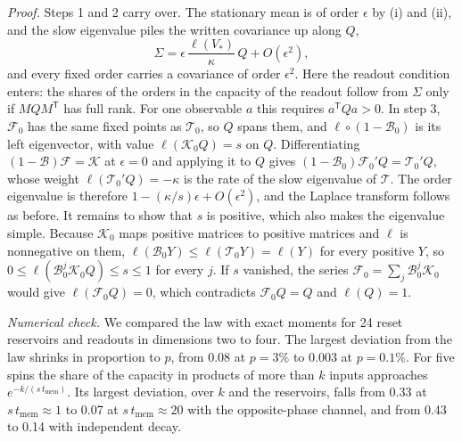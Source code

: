 \emph{Proof.} Steps 1 and 2 carry over. The stationary mean is of order $\epsilon$ by (i) and (ii), and the slow
eigenvalue piles the written covariance up along $Q$,
\begin{equation*}
  \Sigma=\epsilon\,\frac{\ell(V_*)}{\kappa}\,Q+O(\epsilon^2),
\end{equation*}
and every fixed order carries a covariance of order $\epsilon^2$. Here the readout condition enters: the shares of the orders in the capacity of the readout follow from $\Sigma$ only
if $MQM^{\mathsf T}$ has full rank. For one observable $a$ this requires $a^{\mathsf T}Qa>0$. In step 3,
$\mathcal F_0$ has the same fixed points as $\mathcal T_0$, so $Q$ spans them, and $\ell\circ(1-\mathcal B_0)$ is its
left eigenvector, with value $\ell(\mathcal K_0Q)=s$ on $Q$. Differentiating $(1-\mathcal B)\mathcal F=\mathcal K$ at
$\epsilon=0$ and applying it to $Q$ gives $(1-\mathcal B_0)\mathcal F_0'Q=\mathcal T_0'Q$, whose weight
$\ell(\mathcal T_0'Q)=-\kappa$ is the rate of the slow eigenvalue of $\mathcal T$. The order eigenvalue is
therefore $1-(\kappa/s)\epsilon+O(\epsilon^2)$, and the Laplace transform follows as before. It remains to show that $s$ is positive, which also makes the eigenvalue
simple. Because $\mathcal K_0$ maps positive matrices to positive matrices and $\ell$ is nonnegative on them,
$\ell(\mathcal B_0Y)\le\ell(\mathcal T_0Y)=\ell(Y)$ for every positive $Y$, so $0\le\ell(\mathcal
B_0^j\mathcal K_0Q)\le s\le1$ for every $j$. If $s$ vanished, the series $\mathcal F_0=\sum_j\mathcal B_0^j\mathcal
K_0$ would give $\ell(\mathcal F_0Q)=0$, which contradicts $\mathcal F_0Q=Q$ and $\ell(Q)=1$.

\emph{Numerical check.} We compared the law with exact moments for 24 reset reservoirs and readouts in dimensions two to four. The largest
deviation from the law shrinks in proportion to $p$, from 0.08 at $p=3\%$ to 0.003 at $p=0.1\%$. For five spins the share of the capacity in products of more than $k$ inputs approaches
$e^{-k/(s\,t_{\mathrm{mem}})}$. Its largest deviation, over $k$ and the reservoirs, falls from 0.33 at
$s\,t_{\mathrm{mem}}\approx1$ to 0.07 at $s\,t_{\mathrm{mem}}\approx20$ with the opposite-phase channel, and from
0.43 to 0.14 with independent decay.

